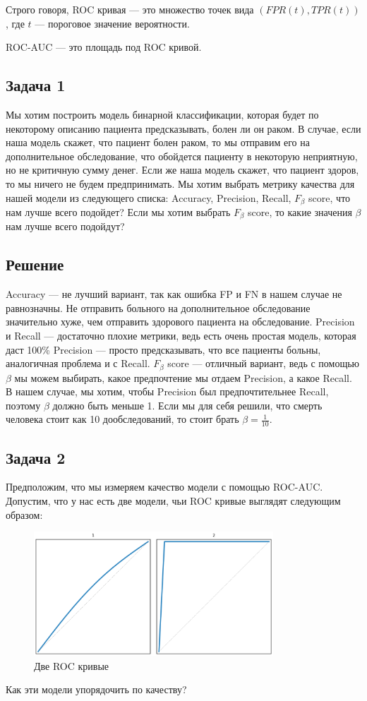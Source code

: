 Строго говоря, ROC кривая --- это множество точек вида $(FPR(t), TPR(t))$, где $t$ --- пороговое значение вероятности.

ROC-AUC --- это площадь под ROC кривой.

\subsection*{Задача 1}

Мы хотим построить модель бинарной классификации, которая будет по некоторому описанию пациента предсказывать, болен ли он раком.
В случае, если наша модель скажет, что пациент болен раком, то мы отправим его на дополнительное обследование, что обойдется пациенту в некоторую неприятную, но не критичную сумму денег.
Если же наша модель скажет, что пациент здоров, то мы ничего не будем предпринимать.
Мы хотим выбрать метрику качества для нашей модели из следующего списка: Accuracy, Precision, Recall, $F_{\beta}$ score, что нам лучше всего подойдет?
Если мы хотим выбрать $F_{\beta}$ score, то какие значения $\beta$ нам лучше всего подойдут?

\subsection*{Решение}
Accuracy --- не лучший вариант, так как ошибка FP и FN в нашем случае не равнозначны.
Не отправить больного на дополнительное обследование значительно хуже, чем отправить здорового пациента на обследование.
Precision и Recall --- достаточно плохие метрики, ведь есть очень простая модель, которая даст 100\% Precision --- просто предсказывать, что все пациенты больны, аналогичная проблема и с Recall.
$F_{\beta}$ score --- отличный вариант, ведь с помощью $\beta$ мы можем выбирать, какое предпочтение мы отдаем Precision, а какое Recall.
В нашем случае, мы хотим, чтобы Precision был предпочтительнее Recall, поэтому $\beta$ должно быть меньше 1.
Если мы для себя решили, что смерть человека стоит как 10 дообследований, то стоит брать $\beta = \frac{1}{10}$.

\subsection*{Задача 2}
Предположим, что мы измеряем качество модели с помощью ROC-AUC. Допустим, что у нас есть две модели, чьи ROC кривые выглядят следующим образом:
\begin{figure}[h]
    \centering
    \includegraphics[width=0.8\textwidth]{chapters/feature_selection/roc_curves_comparison_1.png}
    \caption{Две ROC кривые}
\end{figure}
Как эти модели упорядочить по качеству?

